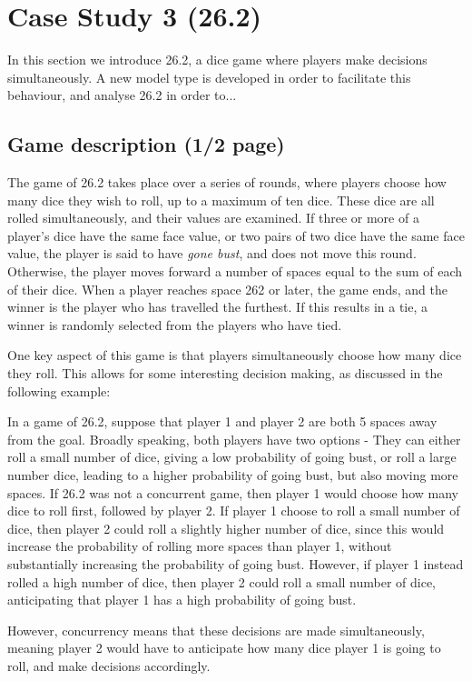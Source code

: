 \chapter{Case Study 3 (26.2)}
\label{ch:cs3}

In this section we introduce 26.2, a dice game where players make decisions simultaneously. A new model type is developed in order to facilitate this behaviour, and analyse 26.2 in order to... 

\section{Game description (1/2 page)}

The game of 26.2 takes place over a series of rounds, where players choose how many dice they wish to roll, up to a maximum of ten dice. These dice are all rolled simultaneously, and their values are examined. If three or more of a player's dice have the same face value, or two pairs of two dice have the same face value, the player is said to have \emph{gone bust}, and does not move this round. Otherwise, the player moves forward a number of spaces equal to the sum of each of their dice. When a player reaches space 262 or later, the game ends, and the winner is the player who has travelled the furthest. If this results in a tie, a winner is randomly selected from the players who have tied.

One key aspect of this game is that players simultaneously choose how many dice they roll. This allows for some interesting decision making, as discussed in the following example:

\begin{example}
\label{cs3:example_concurrency}

In a game of 26.2, suppose that player 1 and player 2 are both 5 spaces away from the goal. Broadly speaking, both players have two options - They can either roll a small number of dice, giving a low probability of going bust, or roll a large number dice, leading to a higher probability of going bust, but also moving more spaces. If 26.2 was not a concurrent game, then player 1 would choose how many dice to roll first, followed by player 2. If player 1 choose to roll a small number of dice, then player 2 could roll a slightly higher number of dice, since this would increase the probability of rolling more spaces than player 1, without substantially increasing the probability of going bust. However, if player 1 instead rolled a high number of dice, then player 2 could roll a small number of dice, anticipating that player 1 has a high probability of going bust.

However, concurrency means that these decisions are made simultaneously, meaning player 2 would have to anticipate how many dice player 1 is going to roll, and make decisions accordingly.

\end{example}

